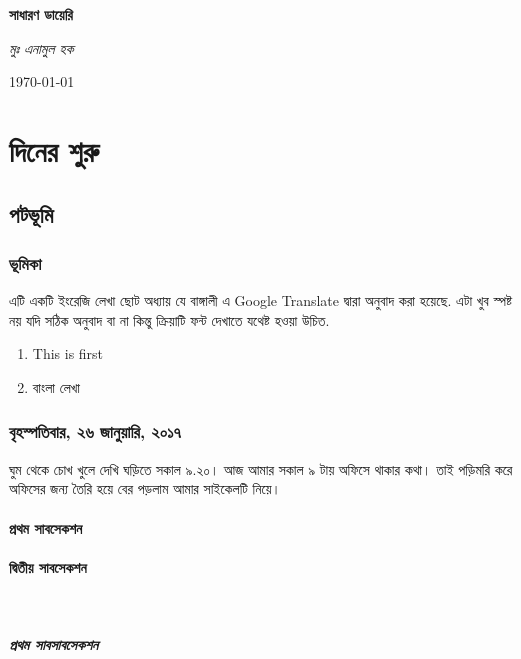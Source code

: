 \documentclass[12pt]{report}
\begin{document}
\begin{titlepage}
	\centering
	\vspace{1.5cm}
	{\huge\bfseries সাধারণ ডায়েরি\par}
	\vspace{1.25cm}
	{\Large\itshape মুঃ এনামুল হক\par}
	\vfill

	{\large \today\par}
\end{titlepage}

\tableofcontents

\part{দিনের শুরু}
\chapter{পটভূমি}
\section{ভূমিকা}
এটি একটি ইংরেজি লেখা ছোট অধ্যায় যে বাঙ্গালী এ \textenglish{Google Translate} দ্বারা অনুবাদ করা হয়েছে. এটা খুব স্পষ্ট নয় যদি সঠিক অনুবাদ বা না কিন্তু ক্রিয়াটি ফন্ট দেখাতে যথেষ্ট হওয়া উচিত.

\begin{enumerate}
    \item   \foreignlanguage{english}{This is first}
    \item   বাংলা লেখা
\end{enumerate}

\section{বৃহস্পতিবার, ২৬ জানুয়ারি, ২০১৭}
ঘুম থেকে চোখ খুলে দেখি ঘড়িতে সকাল ৯.২০। আজ আমার সকাল ৯ টায় অফিসে থাকার কথা। তাই পড়িমরি করে অফিসের জন্য তৈরি হয়ে বের পড়লাম আমার সাইকেলটি নিয়ে।

\subsection{প্রথম সাবসেকশন}
\subsection{দ্বিতীয় সাবসেকশন}
‌‌\subsubsection{প্রথম সাবসাবসেকশন}
\end{document}
